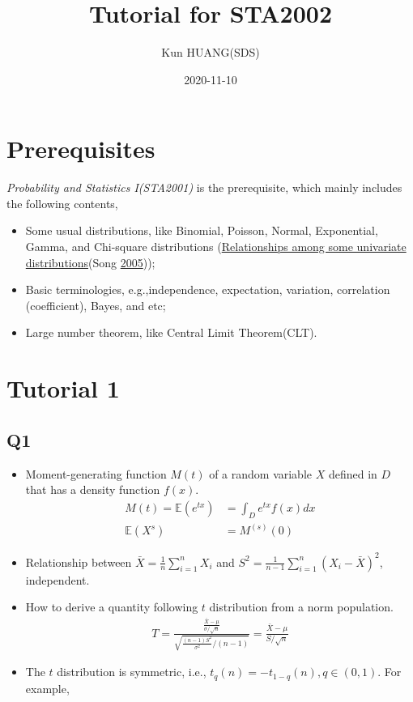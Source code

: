 \documentclass[
]{book}
\title{Tutorial for STA2002}
\author{Kun HUANG(SDS)}
\date{2020-11-10}
\theoremstyle{definition}
\theoremstyle{definition}
\theoremstyle{definition}
\theoremstyle{remark}
\begin{document}
\maketitle

{
\setcounter{tocdepth}{1}
\tableofcontents
}
\hypertarget{prerequisites}{%
\chapter*{Prerequisites}\label{prerequisites}}

\emph{Probability and Statistics I(STA2001)} is the prerequisite, which mainly includes the following contents,

\begin{itemize}
\item
  Some usual distributions, like Binomial, Poisson, Normal, Exponential, Gamma, and Chi-square distributions (\href{https://www.tandfonline.com/doi/pdf/10.1080/07408170590948512?needAccess=true}{Relationships among some univariate
  distributions}(Song \protect\hyperlink{ref-song2005relationships}{2005}));
\item
  Basic terminologies, e.g.,independence, expectation, variation, correlation (coefficient), Bayes, and etc;
\item
  Large number theorem, like Central Limit Theorem(CLT).
\end{itemize}

\hypertarget{sec:T1}{%
\chapter{Tutorial 1}\label{sec:T1}}

\hypertarget{q1}{%
\section{Q1}\label{q1}}

\begin{itemize}
\item
  Moment-generating function \(M(t)\) of a random variable \(X\) defined in \(D\) that has a density function \(f(x)\).
  \begin{align}
  M(t) = \mathbb{E}(e^{tx}) &= \int_{D} e^{tx}f(x)dx\\
  \mathbb{E}(X^{s}) &= M^{(s)}(0)
  \end{align}
\item
  Relationship between \(\bar X=\frac{1}{n}\sum\limits_{i=1}^n X_i\) and \(S^2=\frac{1}{n-1}\sum\limits_{i=1}^n(X_i-\bar X)^2\), independent.
\item
  How to derive a quantity following \(t\) distribution from a norm population.
  \begin{align}
  T=\frac{\frac{\bar{X}-\mu}{\sigma / \sqrt{n}}}{\sqrt{\frac{(n-1) S^{2}}{\sigma^{2}} /(n-1)}}=\frac{\bar{X}-\mu}{S / \sqrt{n}}
  \end{align}
\item
  The \(t\) distribution is symmetric, i.e., \(t_{q}(n) = -t_{1-q}(n), q\in(0,1)\). For example,
\end{itemize}
\end{document}
